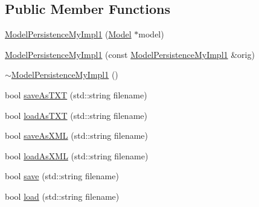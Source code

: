 \subsection*{Public Member Functions}
\begin{DoxyCompactItemize}
\item 
\hyperlink{class_model_persistence_my_impl1_a1f1c3099ee5470514ac021fbe8f6fac0}{Model\-Persistence\-My\-Impl1} (\hyperlink{class_model}{Model} $\ast$model)
\item 
\hyperlink{class_model_persistence_my_impl1_a3df2056ec9c57daea05630b3df1439b8}{Model\-Persistence\-My\-Impl1} (const \hyperlink{class_model_persistence_my_impl1}{Model\-Persistence\-My\-Impl1} \&orig)
\item 
\hyperlink{class_model_persistence_my_impl1_ab84fa247d7415d856141a8932502c362}{$\sim$\-Model\-Persistence\-My\-Impl1} ()
\item 
bool \hyperlink{class_model_persistence_my_impl1_a367b40dfac801508f75a3176f7b40c6a}{save\-As\-T\-X\-T} (std\-::string filename)
\item 
bool \hyperlink{class_model_persistence_my_impl1_aa4cf0301bf21bc177eee3e9f9320c382}{load\-As\-T\-X\-T} (std\-::string filename)
\item 
bool \hyperlink{class_model_persistence_my_impl1_a0a4c157a22510a188c4b76324ea666b0}{save\-As\-X\-M\-L} (std\-::string filename)
\item 
bool \hyperlink{class_model_persistence_my_impl1_a9047bd5d2f72ef6978cf27a8df38b7b5}{load\-As\-X\-M\-L} (std\-::string filename)
\item 
bool \hyperlink{class_model_persistence_my_impl1_ab24f2e3aea25d628748dd8b9e63d326a}{save} (std\-::string filename)
\item 
bool \hyperlink{class_model_persistence_my_impl1_a5e35c3da319f209a8d2585ec6e781a45}{load} (std\-::string filename)
\end{DoxyCompactItemize}


